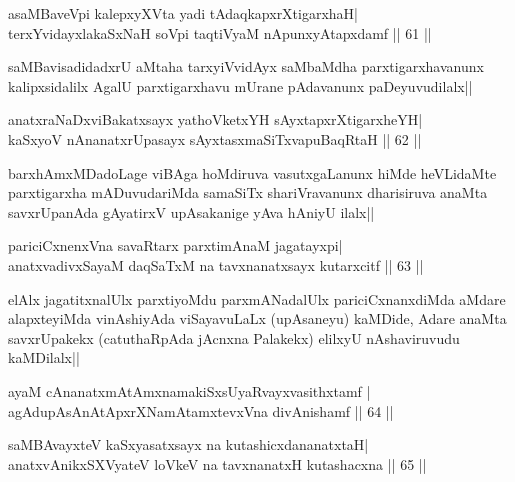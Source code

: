 \begin{shl}
asaMBaveV\s pi kalepxyXVta yadi tAdaqkapxrXtigarxhaH| \\
terxYvidayxlakaSxNaH soV\s pi taqtiVyaM nA\s \s punxyAtapxdamf \hfill ||  61 || 
\end{shl}

\begin{artha} 
saMBavisadidadxrU aMtaha tarxyiVvidAyx saMbaMdha parxtigarxhavanunx 
kalipxsidalilx AgalU parxtigarxhavu mUrane pAdavanunx paDeyuvudilalx||
\end{artha}


\begin{shl}
anatxraNaDxviBakatxsayx yathoVketxYH sAyxtapxrXtigarxheYH| \\
kaSxyoV nAnanatxrUpasayx sAyxtasxmaSiTxvapuBaqRtaH \hfill||  62 || 
\end{shl}

\begin{artha} 
barxhAmxMDadoLage viBAga hoMdiruva vasutxgaLanunx hiMde heVLidaMte 
parxtigarxha mADuvudariMda samaSiTx shariVravanunx dharisiruva anaMta 
savxrUpanAda gAyatirxV upAsakanige yAva hAniyU ilalx||
\end{artha}


\begin{shl}
pariciCxnenxVna savaRtarx parxtimAnaM jagatayxpi| \\
anatxvadivxSayaM daqSaTxM na tavxnanatxsayx kutarxcitf \hfill||  63 || 
\end{shl}

\begin{artha} 
elAlx jagatitxnalUlx parxtiyoMdu parxmANadalUlx pariciCxnanxdiMda 
aMdare alapxteyiMda vinAshiyAda viSayavuLaLx (upAsaneyu) kaMDide, 
Adare anaMta savxrUpakekx (catuthaRpAda jAcnxna Palakekx) elilxyU 
nAshaviruvudu kaMDilalx||
\end{artha}


\begin{shl}
ayaM cAnanatxmAtAmxnamakiSxsUyaRvayxvasithxtamf | \\
agAdupAsAnAtApxrXNamAtamxtevxVna divAnishamf \hfill||  64 || 
\end{shl}

\begin{shl}
saMBAvayxteV kaSxyasatxsayx na kutashicxdananatxtaH| \\
anatxvAnikxSXVyateV loVkeV na tavxnanatxH kutashacxna \hfill||  65 || 
\end{shl}

